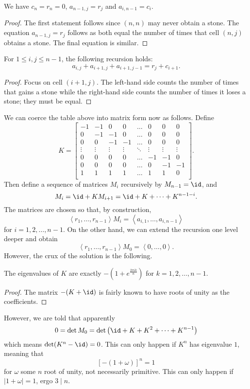 \documentclass[11pt]{scrartcl}
\begin{document}
\begin{claim*}
  We have $c_n = r_n = 0$, $a_{n-1,j} = r_j$ and $a_{i,n-1} = c_i$.
\end{claim*}
\begin{proof}
  The first statement follows since $(n,n)$ may never obtain a stone.
  The equation $a_{n-1,j} = r_j$ follows as both equal the number of times
  that cell $(n,j)$ obtains a stone.
  The final equation is similar.
\end{proof}

\begin{claim*}
  For $1 \le i,j \le n-1$, the following recursion holds:
  \[ a_{i,j} + a_{i+1,j} + a_{i+1,j-1} = r_j + c_{i+1}. \]
\end{claim*}
\begin{proof}
  Focus on cell $(i+1,j)$.
  The left-hand side counts the number of times that gains a stone
  while the right-hand side counts the number of times it loses a stone;
  they must be equal.
\end{proof}
We can coerce the table above into matrix form now as follows.
Define
\[
  K = \begin{bmatrix}
    -1 & -1 & 0 & 0 & \dots & 0 & 0 & 0 \\
    0 & -1 & -1 & 0 & \dots & 0 & 0 & 0 \\
    0 & 0 & -1 & -1 & \dots & 0 & 0 & 0 \\
    \vdots & \vdots & \vdots & \vdots & \ddots & \vdots & \vdots & \vdots \\
    0 & 0 & 0 & 0 & \dots & -1 & -1 & 0 \\
    0 & 0 & 0 & 0 & \dots & 0 & -1 & -1 \\
    1 & 1 & 1 & 1 & \dots & 1 & 1 & 0 \\
  \end{bmatrix}.
\]
Then define a sequence of matrices $M_i$ recursively by $M_{n-1} = \id$,
and \[ M_i = \id + K M_{i+1} = \id + K + \dots  + K^{n-1-i}. \]
The matrices are chosen so that, by construction,
\[ \left< r_1, \dots, r_{n-1} \right> M_i = \left< a_{i,1}, \dots, a_{i,n-1} \right> \]
for $i=1,2,\dots,n-1$.
On the other hand, we can extend the recursion one level deeper and obtain
\[ \left< r_1, \dots, r_{n-1} \right> M_0 = \left< 0, \dots, 0 \right>. \]
However, the crux of the solution is the following.
\begin{claim*}
  The eigenvalues of $K$ are exactly $-(1+e^{\frac{2\pi i k}{n}})$
  for $k=1,2,\dots,n-1$.
\end{claim*}
\begin{proof}
  The matrix $-(K+\id)$ is fairly known to have roots of unity
  as the coefficients.
\end{proof}
However, we are told that apparently
\[ 0 = \det M_0 = \det\left( \id + K + K^2 + \dots + K^{n-1} \right) \]
which means $\det(K^n - \id) = 0$.
This can only happen if $K^n$ has eigenvalue $1$, meaning that
\[ \left[ -(1+\omega) \right]^n = 1 \]
for $\omega$ some $n$ root of unity, not necessarily primitive.
This can only happen if $\left\lvert 1+\omega \right\rvert = 1$, ergo $3 \mid n$.
\pagebreak
\end{document}
